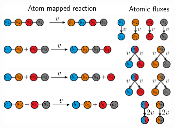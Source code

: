 \documentclass{standalone}
\begin{document}
\begin{figure}
     \begin{subfigure}[t]{1.0\textwidth}
        \includegraphics[]{header.pdf}
        \vspace*{-1.0ex}
        \caption{}
        \includegraphics[]{case-1.pdf}
        \caption{}
        \includegraphics[]{case-2.pdf}
        \caption{}
        \includegraphics[]{case-3.pdf}
        \caption{}
        \includegraphics[]{case-4.pdf}
    \end{subfigure}
\end{figure}
\end{document}
